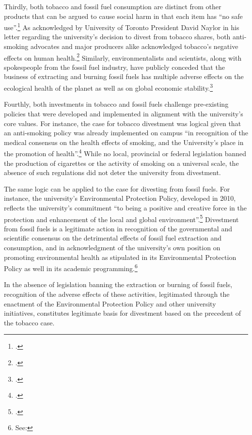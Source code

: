 Thirdly, both tobacco and fossil fuel consumption are distinct from other products that can be argued to cause social harm in that each item has ``no safe use''.\footcite[See: ][p. 9]{TobaccoReport_2007}
As acknowledged by University of Toronto President David Naylor in his letter regarding the university's decision to divest from tobacco shares, both anti-smoking advocates and major producers alike acknowledged tobacco's negative effects on human health.\footcite[][]{TStarSellOff}  
Similarly, environmentalists and scientists, along with spokespeople from the fossil fuel industry, have publicly conceded that the business of extracting and burning fossil fuels has multiple adverse effects on the ecological health of the planet as well as on global economic stability.\footcite[See, for example: ][p. 3--18]{OilIndustryVanDenHove}



Fourthly, both investments in tobacco and fossil fuels challenge pre-existing policies that were developed and implemented in alignment with the university's core values. 
For instance, the case for tobacco divestment was logical given that an anti-smoking policy was already implemented on campus ``in recognition of the medical consensus on the health effects of smoking, and the University's place in the promotion of health''.\footcite[See: ][p. 9]{TobaccoReport_2007}
While no local, provincial or federal legislation banned the production of cigarettes or the activity of smoking on a universal scale, the absence of such regulations did not deter the university from divestment. 



The same logic can be applied to the case for divesting from fossil fuels. 
For instance, the university's Environmental Protection Policy, developed in 2010, reflects the university's commitment ``to being a positive and creative force in the protection and enhancement of the local and global environment''.\footcite[][]{UTEnvProtectionPolicy}
Divestment from fossil fuels is a legitimate action in recognition of the governmental and scientific consensus on the detrimental effects of fossil fuel extraction and consumption, and in acknowledgment of the university's own position on promoting environmental health as stipulated in its Environmental Protection Policy as well in its academic programming.\footnote{See: }




In the absence of legislation banning the extraction or burning of fossil fuels, recognition of the adverse effects of these activities, legitimated through the enactment of the Environmental Protection Policy and other university initiatives, constitutes legitimate basis for divestment based on the precedent of the tobacco case.  



